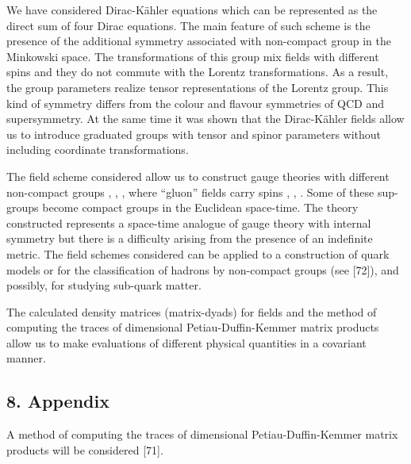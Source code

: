 \documentclass[a4paper,12pt]{article}
\begin{document}
We have considered Dirac-K\"ahler equations which can be represented as the
direct sum of four Dirac equations. The main feature of such scheme is the
presence of the additional symmetry associated with non-compact group in the
Minkowski space. The transformations of this group mix fields with different
spins and they do not commute with the Lorentz transformations. As a result,
the group parameters realize tensor representations of the Lorentz group.
This kind of symmetry differs from the colour and flavour symmetries of QCD
and supersymmetry. At the same time it was shown that the Dirac-K\"ahler
fields allow us to introduce graduated groups with tensor and spinor
parameters without including coordinate transformations.

The field scheme considered allow us to construct gauge theories with
different non-compact groups \coordHE{}, \coordHE{}, \coordHE{}, where ``gluon''
fields carry spins \coordHE{}, \coordHE{}, \coordHE{}. Some of these sup-groups become compact
groups in the Euclidean space-time. The theory constructed represents a
space-time analogue of gauge theory with internal symmetry but there is a
difficulty arising from the presence of an indefinite metric. The field
schemes considered can be applied to a construction of quark models or for
the classification of hadrons by non-compact groups (see [72]), and
possibly, for studying sub-quark matter.

The calculated density matrices (matrix-dyads) for fields and the method of
computing the traces of \coordHE{}dimensional Petiau-Duffin-Kemmer matrix
products allow us to make evaluations of different physical quantities in a
covariant manner.

\subsection{8. Appendix}

A method of computing the traces of \coordHE{}dimensional Petiau-Duffin-Kemmer
matrix products will be considered [71].
\end{document}
